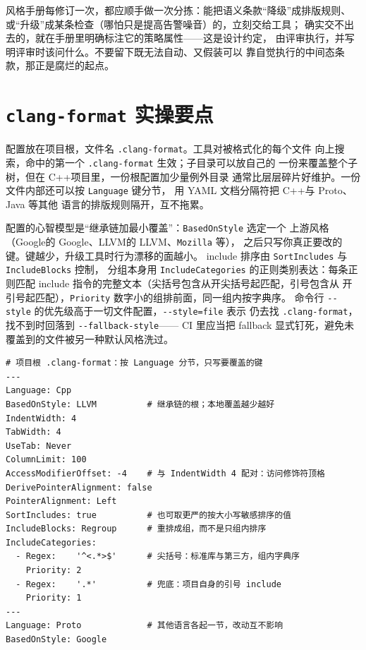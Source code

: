 \documentclass[12pt,a4paper,fontset=fandol]{ctexbook}
\newcommand{\Tp}[1]{\texttt{#1}}
\newcommand{\Opt}[1]{\texttt{-\/-#1}}
\newcommand{\Lang}[1]{\textsf{#1}}
\newcommand{\CPP}{\Lang{C++}}
\newcommand{\DomGo}{\Lang{Google}}
\newcommand{\DomLlvm}{\Lang{LLVM}}
\begin{document}
\begin{guideline}[title={手册的演化方向}]
风格手册每修订一次，都应顺手做一次分拣：能把语义条款``降级''成排版规则、
或``升级''成某条检查（哪怕只是提高告警噪音）的，立刻交给工具；
确实交不出去的，就在手册里明确标注它的策略属性——这是设计约定，
由评审执行，并写明评审时该问什么。不要留下既无法自动、又假装可以
靠自觉执行的中间态条款，那正是腐烂的起点。
\end{guideline}

\section{\Tp{clang-format} 实操要点}
\label{sec:ch13-format}

配置放在项目根，文件名 \Tp{.clang-format}。工具对被格式化的每个文件
向上搜索，命中的第一个 \Tp{.clang-format} 生效；子目录可以放自己的
一份来覆盖整个子树，但在 \CPP 项目里，一份根配置加少量例外目录
通常比层层碎片好维护。一份文件内部还可以按 \Tp{Language} 键分节，
用 YAML 文档分隔符把 \CPP 与 \Lang{Proto}、\Lang{Java} 等其他
语言的排版规则隔开，互不拖累。

配置的心智模型是``继承链加最小覆盖''：\Tp{BasedOnStyle} 选定一个
上游风格（\DomGo 的 Google、\DomLlvm 的 LLVM、\Tp{Mozilla} 等），
之后只写你真正要改的键。键越少，升级工具时行为漂移的面越小。
include 排序由 \Tp{SortIncludes} 与 \Tp{IncludeBlocks} 控制，
分组本身用 \Tp{IncludeCategories} 的正则类别表达：每条正则匹配
include 指令的完整文本（尖括号包含从开尖括号起匹配，引号包含从
开引号起匹配），\Tp{Priority} 数字小的组排前面，同一组内按字典序。
命令行 \Opt{style} 的优先级高于一切文件配置，\Opt{style=file} 表示
仍去找 \Tp{.clang-format}，找不到时回落到 \Opt{fallback-style}——
CI 里应当把 fallback 显式钉死，避免未覆盖到的文件被另一种默认风格洗过。

\begin{lstlisting}[style=yamlstyle]
# 项目根 .clang-format：按 Language 分节，只写要覆盖的键
---
Language: Cpp
BasedOnStyle: LLVM          # 继承链的根；本地覆盖越少越好
IndentWidth: 4
TabWidth: 4
UseTab: Never
ColumnLimit: 100
AccessModifierOffset: -4    # 与 IndentWidth 4 配对：访问修饰符顶格
DerivePointerAlignment: false
PointerAlignment: Left
SortIncludes: true          # 也可取更严的按大小写敏感排序的值
IncludeBlocks: Regroup      # 重排成组，而不是只组内排序
IncludeCategories:
  - Regex:    '^<.*>$'      # 尖括号：标准库与第三方，组内字典序
    Priority: 2
  - Regex:    '.*'          # 兜底：项目自身的引号 include
    Priority: 1
---
Language: Proto             # 其他语言各起一节，改动互不影响
BasedOnStyle: Google
\end{lstlisting}
\end{document}

